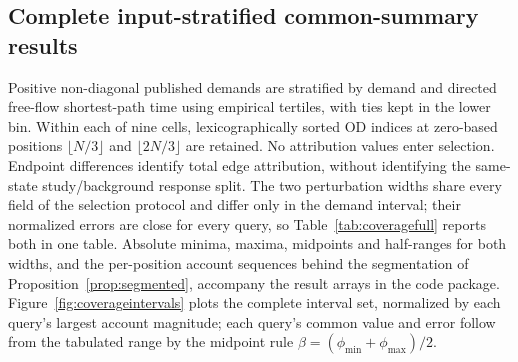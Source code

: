 \subsection{Complete input-stratified common-summary results}\label{sec:coverage}
Positive non-diagonal published demands are stratified by demand and directed free-flow shortest-path time using empirical tertiles, with ties kept in the lower bin. Within each of nine cells, lexicographically sorted OD indices at zero-based positions $\lfloor N/3\rfloor$ and $\lfloor2N/3\rfloor$ are retained. No attribution values enter selection. Endpoint differences identify total edge attribution, without identifying the same-state study/background response split. The two perturbation widths share every field of the selection protocol and differ only in the demand interval; their normalized errors are close for every query, so Table~\ref{tab:coveragefull} reports both in one table. Absolute minima, maxima, midpoints and half-ranges for both widths, and the per-position account sequences behind the segmentation of Proposition~\ref{prop:segmented}, accompany the result arrays in the code package. Figure~\ref{fig:coverageintervals} plots the complete interval set, normalized by each query's largest account magnitude; each query's common value and error follow from the tabulated range by the midpoint rule $\beta=(\phi_{\min}+\phi_{\max})/2$.
